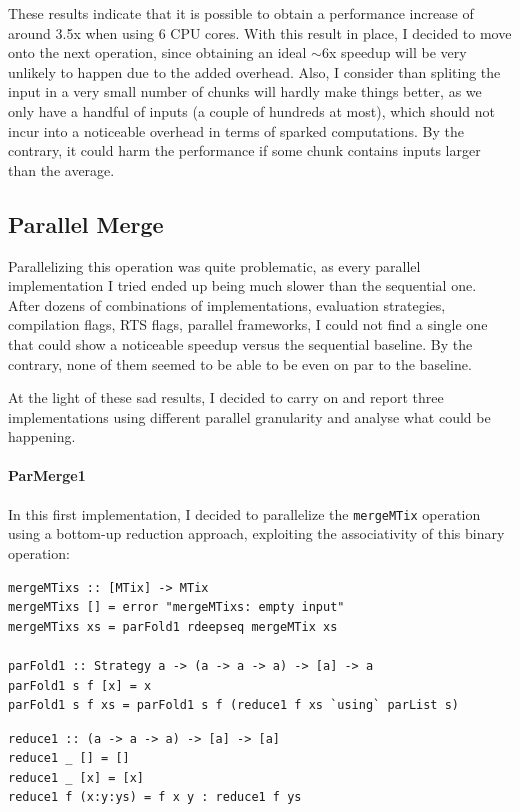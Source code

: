 \documentclass[a4paper,10pt]{article}
\begin{document}
These results indicate that it is possible to obtain a performance increase of
around 3.5x when using 6 CPU cores.
%
With this result in place, I decided to move onto the next operation, since
obtaining an ideal $\sim$6x speedup will be very unlikely to happen due to
the added overhead.
%
Also, I consider than spliting the input in a very small number of chunks will
hardly make things better, as we only have a handful of inputs (a couple of
hundreds at most), which should not incur into a noticeable overhead in terms of
sparked computations.
%
By the contrary, it could harm the performance if some chunk contains inputs
larger than the average.

\subsection*{Parallel Merge}

Parallelizing this operation was quite problematic, as every parallel
implementation I tried ended up being much slower than the sequential one.
%
After dozens of combinations of implementations, evaluation strategies,
compilation flags, RTS flags, parallel frameworks, I could not find a single one
that could show a noticeable speedup versus the sequential baseline.
%
By the contrary, none of them seemed to be able to be even on par to the
baseline.

At the light of these sad results, I decided to carry on and report three
implementations using different parallel granularity and analyse what could be
happening.

\paragraph{ParMerge1}

In this first implementation, I decided to parallelize the \texttt{mergeMTix}
operation using a bottom-up reduction approach, exploiting the associativity of
this binary operation:

\begin{verbatim}
mergeMTixs :: [MTix] -> MTix
mergeMTixs [] = error "mergeMTixs: empty input"
mergeMTixs xs = parFold1 rdeepseq mergeMTix xs

parFold1 :: Strategy a -> (a -> a -> a) -> [a] -> a
parFold1 s f [x] = x
parFold1 s f xs = parFold1 s f (reduce1 f xs `using` parList s)
\end{verbatim}

\begin{verbatim}
reduce1 :: (a -> a -> a) -> [a] -> [a]
reduce1 _ [] = []
reduce1 _ [x] = [x]
reduce1 f (x:y:ys) = f x y : reduce1 f ys
\end{verbatim}
\end{document}
